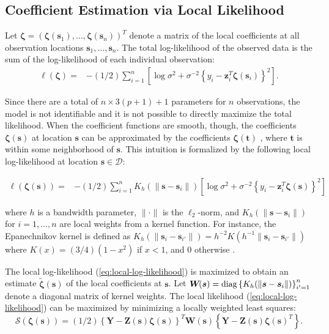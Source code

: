\documentclass[authoryear,review, 12pt]{elsarticle}
\begin{document}
\subsection{Coefficient Estimation via Local Likelihood}

Let $\bm{\zeta}=\left(\bm{\zeta}(\bm{s}_{1}),\dots,\bm{\zeta}(\bm{s}_{n})\right)^{T}$
denote a matrix of the local coefficients at all observation locations
$\bm{s}_{1},\dots,\bm{s}_{n}$. The total log-likelihood of the observed
data is the sum of the log-likelihood of each individual observation:
\begin{align}
\ell\left(\bm{\zeta}\right)= & -(1/2)\sum_{i=1}^{n}\left[\log{\sigma^{2}}+\sigma^{-2}\left\{ y_{i}-\bm{z}_{i}^{T}\bm{\zeta}(\bm{s}_{i})\right\} ^{2}\right].\label{eq:coefficients}
\end{align}


Since there are a total of $n\times3(p+1)+1$ parameters for $n$
observations, the model is not identifiable and it is not possible
to directly maximize the total likelihood. When the coefficient functions
are smooth, though, the coefficients $\bm{\zeta}(\bm{s})$ at location
$\bm{s}$ can be approximated by the coefficients $\bm{\zeta}(\bm{t})$
, where $\bm{t}$ is within some neighborhood of $\bm{s}$. This intuition
is formalized by the following local log-likelihood at location $\bm{s}\in\mathcal{D}$:

\begin{align}
\ell\left(\bm{\zeta}(\bm{s})\right)= & -(1/2)\sum_{i=1}^{n}K_{h}(\|\bm{s}-\bm{s}_{i}\|)\left[\log\sigma^{2}+\sigma^{-2}\left\{ y_{i}-\bm{z}_{i}^{T}\bm{\zeta}(\bm{s})\right\} ^{2}\right]\label{eq:local-log-likelihood}
\end{align}


where $h$ is a bandwidth parameter, $\|\cdot\|$ is the $\ell_{2}$-norm,
and $K_{h}(\|\bm{s}-\bm{s}_{i}\|)$ for $i=1,\dots,n$ are local weights
from a kernel function. For instance, the Epanechnikov kernel is defined
as $K_{h}(\|\bm{s}_{i}-\bm{s}_{i'}\|)=h^{-2}K\left(h^{-1}\|\bm{s}_{i}-\bm{s}_{i'}\|\right)$
where $K(x)=(3/4)(1-x^{2})$ if $x<1$, and $0$ otherwise \citep{Samiuddin-el-Sayyad-1990}.

The local log-likelihood (\ref{eq:local-log-likelihood}) is maximized
to obtain an estimate $\tilde{\bm{\zeta}}(\bm{s})$ of the local coefficients
at $\bm{s}$. Let $\bm{W}\!(\bm{s})={\rm diag}\left\{ K_{h}(\|\bm{s}-\bm{s}_{i}\|)\right\} _{i'=1}^{n}$
denote a diagonal matrix of kernel weights. The local likelihood (\ref{eq:local-log-likelihood})
can be maximized by minimizing a locally weighted least squares: 
\begin{equation}
\mathcal{S}\left(\bm{\zeta}(\bm{s})\right)=(1/2)\left\{ \bm{Y}-\bm{Z}(\bm{s})\bm{\zeta}(\bm{s})\right\} ^{T}\bm{W}\!(\bm{s})\left\{ \bm{Y}-\bm{Z}(\bm{s})\bm{\zeta}(\bm{s})^{T}\right\} .\label{eq:local-sum-of-squares}
\end{equation}
\end{document}
